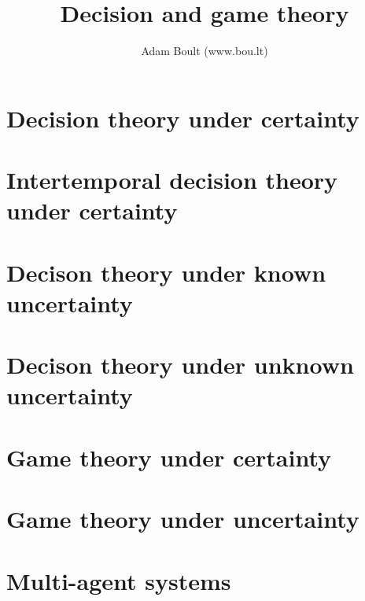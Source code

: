 \documentclass[oneside]{book}
\begin{document}
\author{Adam Boult (www.bou.lt)}
\title{Decision and game theory}
\maketitle

\setcounter{tocdepth}{0}
\tableofcontents



\part{Decision theory under certainty}




\part{Intertemporal decision theory under certainty}




\part{Decison theory under known uncertainty}



\part{Decison theory under unknown uncertainty}






\part{Game theory under certainty}





\part{Game theory under uncertainty}



\part{Multi-agent systems}
\end{document}
